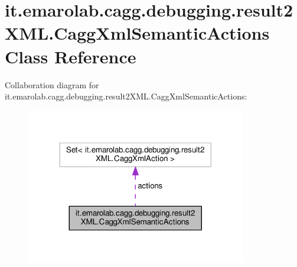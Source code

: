 \hypertarget{classit_1_1emarolab_1_1cagg_1_1debugging_1_1result2XML_1_1CaggXmlSemanticActions}{\section{it.\-emarolab.\-cagg.\-debugging.\-result2\-X\-M\-L.\-Cagg\-Xml\-Semantic\-Actions Class Reference}
\label{classit_1_1emarolab_1_1cagg_1_1debugging_1_1result2XML_1_1CaggXmlSemanticActions}
}


Collaboration diagram for it.\-emarolab.\-cagg.\-debugging.\-result2\-X\-M\-L.\-Cagg\-Xml\-Semantic\-Actions\-:\nopagebreak
\begin{figure}[H]
\begin{center}
\leavevmode
\includegraphics[width=272pt]{classit_1_1emarolab_1_1cagg_1_1debugging_1_1result2XML_1_1CaggXmlSemanticActions__coll__graph}
\end{center}
\end{figure}
